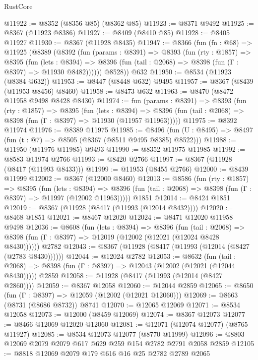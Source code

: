 \begin{lexlean}{RustCore}
\begin{coremodule}
@11922 := @8352 (@8356 @85) (@8362 @85)
@11923 := @8371 @9492
@11925 := @8367 (@11923 @8386)
@11927 := @8409 (@8410 @85)
@11928 := @8405 @11927
@11930 := @8367 (@11928 @8435)
@11947 := @8366
    (fun (fn : @68) =>
    @11925
      (@8389
        (@8392
          (fun (params : @8391) =>
          @8393
            (fun (rty : @1857) =>
            @8395
              (fun (lets : @8394) =>
              @8396 (fun (tail : @2068) => @8398 (fun (Γ : @8397) => @11930 @8482))))))
        @8528))
    @632
@11950 := @8534 (@11923 (@8384 @632))
@11953 := @8447 (@8448 @632) @9495
@11957 := @8367 (@8439 (@11953 @8456) @8460)
@11958 := @8473 @632
@11963 := @8470 (@8472 @11958 @9498 @8428 @8430)
@11974 := fun (params : @8391) =>
  @8393
    (fun (rty : @1857) =>
    @8395
      (fun (lets : @8394) =>
      @8396 (fun (tail : @2068) => @8398 (fun (Γ : @8397) => @11930 (@11957 @11963)))))
@11975 := @8392 @11974
@11976 := @8389 @11975
@11985 := @8496 (fun (U : @8495) => @8497 (fun (t : @7) => @8505 (@8367 (@8511 @9495 @8385) @8522)))
@11988 := @11950 (@11976 @11985) @9493
@11990 := @8352 @11975 @11985
@11992 := @8583 @11974 @2766
@11993 := @8420 @2766
@11997 := @8367 (@11928 (@8417 (@11993 @8433)))
@11999 := @11953 (@8455 @2766)
@12000 := @8439 @11999
@12002 := @8367 (@12000 @8460)
@12013 := @8586
    (fun (rty : @1857) =>
    @8395
      (fun (lets : @8394) =>
      @8396 (fun (tail : @2068) => @8398 (fun (Γ : @8397) => @11997 (@12002 @11963)))))
    @1851
@12014 := @8424 @1851
@12019 := @8367 (@11928 (@8417 (@11993 (@12014 @8432))))
@12020 := @8468 @1851
@12021 := @8467 @12020
@12024 := @8471 @12020 @11958 @9498
@12036 := @8608
    (fun (lets : @8394) =>
    @8396
      (fun (tail : @2068) =>
      @8398 (fun (Γ : @8397) => @12019 (@12002 (@12021 (@12024 @8428 @8430))))))
    @2782
@12043 := @8367 (@11928 (@8417 (@11993 (@12014 (@8427 (@2783 @8430))))))
@12044 := @12024 @2782
@12053 := @8632
    (fun (tail : @2068) => @8398 (fun (Γ : @8397) => @12043 (@12002 (@12021 (@12044 @8430)))))
    @2859
@12058 := @11928 (@8417 (@11993 (@12014 (@8427 @2860))))
@12059 := @8367 @12058
@12060 := @12044 @2859
@12065 := @8650 (fun (Γ : @8397) => @12059 (@12002 (@12021 @12060)))
@12069 := @8663 (@8731 (@8686 @8732)) @8741
@12070 := @12065 @12069
@12071 := @8534 @12058
@12073 := @12000 (@8459 @12069)
@12074 := @8367 @12073
@12077 := @8466 @12069 @12020 @12060
@12081 := @12071 (@12074 @12077) (@8765 @11927)
@12085 := @8534 @12073 @12077 (@8770 @11999)
@12096 := @8803 @12069 @2079 @2079 @617 @629 @259 @154 @2782 @2791 @2058 @2859
@12105 := @8818 @12069 @2079 @179 @616 @16 @25 @2782 @2789 @2065

\end{coremodule}
\end{lexlean}
